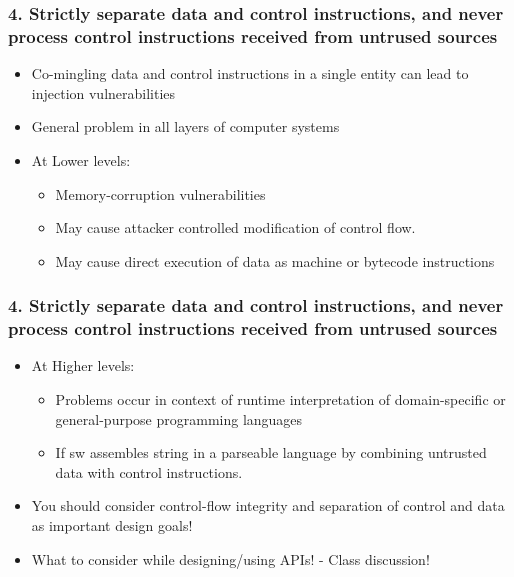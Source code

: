 \documentclass[12pt,norsk]{beamer}
\begin{document}
\begin{frame}

	\frametitle{4. Strictly separate data and control instructions, and never process control instructions received from untrused sources}
	\begin{itemize}
	\item Co-mingling data and control instructions in a single entity can lead to injection vulnerabilities
	\item General problem in all layers of computer systems
	\item At Lower levels:
	
	\begin{itemize}
		\item Memory-corruption vulnerabilities
		\item May cause attacker controlled modification of control flow.
		\item May cause direct execution of data as machine or bytecode instructions
	\end{itemize}
	
	\end{itemize}

\end{frame}
\begin{frame}
	\frametitle{4. Strictly separate data and control instructions, and never process control instructions received from untrused sources}
	\begin{itemize}
	\item At Higher levels:
	\begin{itemize}
		\item Problems occur in context of runtime interpretation of domain-specific or general-purpose programming languages
		\item If sw assembles string in a parseable language by combining untrusted data with control instructions.
	\end{itemize}
	
	\item You should consider control-flow integrity and separation of control and data as important design goals!
	\item What to consider while designing/using APIs! - Class discussion! 
	\end{itemize}

\end{frame}
\end{document}
